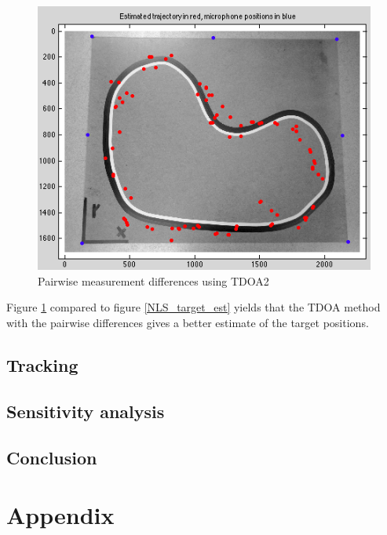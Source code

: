 \documentclass[10pt,a4paper]{report}
\begin{document}
 \begin{figure}[H]
   \includegraphics[width = 350pt]{TDAO_target_est2.png}
   \caption{Pairwise measurement differences using TDOA2}
   \label{TDOA_target_est2}
 \end{figure}
Figure \ref{TDOA_target_est2} compared to figure \ref{NLS_target_est} yields that the TDOA method with the pairwise differences gives a better estimate of the target positions. 


\newpage
\section{Tracking}
\label{Tracking}

\newpage
\section{Sensitivity analysis}
\label{Sensitivity analysis}

\newpage
\section{Conclusion}
\label{Conclusion}

\chapter{Appendix}
\end{document}
